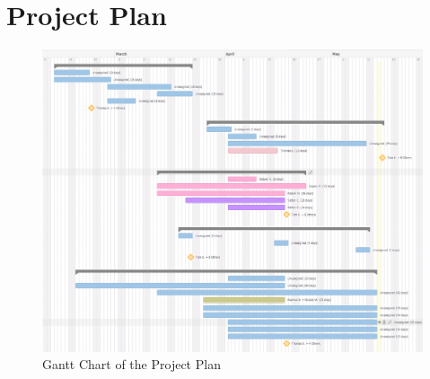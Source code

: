 \section{Project Plan} \label{sec:project-plan}
\begin{figure}[h]
\centering
\includegraphics[width=\columnwidth]{images/gantt-chart.png}
\caption{Gantt Chart of the Project Plan}
\label{fig:gantt-chart}
\end{figure}